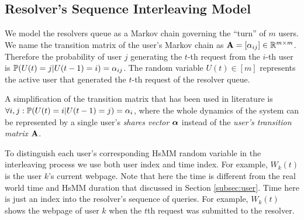 	\subsection{Resolver's Sequence Interleaving Model}
	\label{subsec:interle}
	We model the resolvers queue as a Markov chain governing the ``turn'' of $m$ users.
	We name the transition matrix of the user's Markov chain as $\mathbf{A} = [\alpha_{ij}] \in \mathbb R^{m \times m}$.
	Therefore the probability of user $j$ generating the $t$-th request from the $i$-th user is $\mathbb{P}(U(t)=j|U(t-1)=i) = \alpha_{ij}$.
	The random variable $U(t) \in [m]$ represents the active user that generated the $t$-th request of the resolver queue. 
	
	A simplification of the transition matrix that has been used in literature is $\forall i, j: \mathbb{P}(U(t) = i|U(t-1) = j) = \alpha_i$, where the whole dynamics of the system can be represented by a single user's \emph{shares vector} $\boldsymbol{\alpha}$ instead of the \emph{user's transition matrix} $\mathbf{A}$.
	
	To distinguish each user's corresponding HsMM random variable in the interleaving process we use both user index and time index. For example, $W_{k}(t)$ is the user $k$'s current webpage. 
	Note that here the time is different from the real world time and HsMM duration that discussed in Section \ref{subsec:user}. 
	Time here is just an index into the resolver's sequence of queries.
	For example, $W_{k}(t)$ shows the webpage of user $k$ when the $t$th request was submitted to the resolver. 
	
